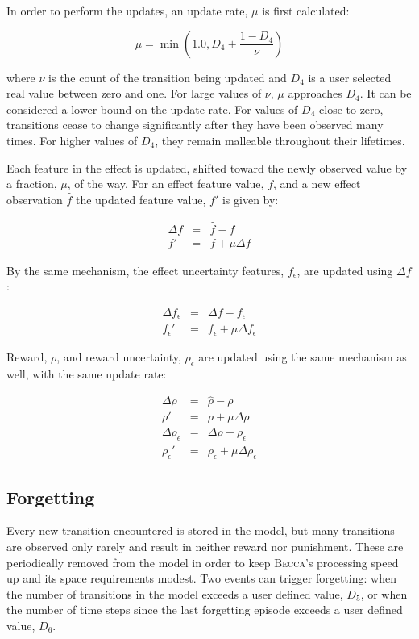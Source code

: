 In order to perform the updates, an update rate, $\mu$ is first calculated:

\begin{equation}
\mu = \min(1.0, D_4+ \frac{1 - D_4}{\nu})
\end{equation}

where $\nu$ is the count of the transition being updated and $D_4$ is a user selected real value between zero and one. For large values of $\nu$, $\mu$ approaches $D_4$. It can be considered a lower bound on the update rate. For values of $D_4$ close to zero, transitions cease to change significantly after they have been observed many times. For higher values of $D_4$, they remain malleable throughout their lifetimes.

Each feature in the effect is updated, shifted toward the newly observed value by a fraction, $\mu$, of the way. For an effect feature value, $f$, and a new effect observation $\hat{f}$ the updated feature value, $f'$ is given by:

\begin{eqnarray}
\Delta f &= &\hat{f}  - f \\
f' &=& f + \mu \Delta f
\end{eqnarray}

By the same mechanism, the effect uncertainty features, $f_\epsilon$, are updated using $\Delta f$:

\begin{eqnarray}
\Delta f_\epsilon &=& \Delta f  - f_\epsilon\\
f_\epsilon' &=& f_\epsilon + \mu \Delta f_\epsilon
\end{eqnarray}

Reward, $\rho$, and reward uncertainty, $\rho_\epsilon$ are updated using the same mechanism as well, with the same update rate:

\begin{eqnarray}
\Delta \rho &= &\hat{\rho} - \rho \\
\rho' &=& \rho + \mu \Delta \rho \\
\Delta \rho_\epsilon &=&\Delta \rho -  \rho_\epsilon \\
\rho_\epsilon' &=& \rho_\epsilon + \mu \Delta \rho_\epsilon
\end{eqnarray}

\subsection{Forgetting}
Every new transition encountered is stored in the model, but many transitions are observed only rarely and result in neither reward nor punishment. These are periodically removed from the model in order to keep \textsc{Becca}'s processing speed up and its space requirements modest. Two events can trigger forgetting: when the number of transitions in the model exceeds a user defined value, $D_5$, or when the number of time steps since the last forgetting episode exceeds a user defined value, $D_6$.


